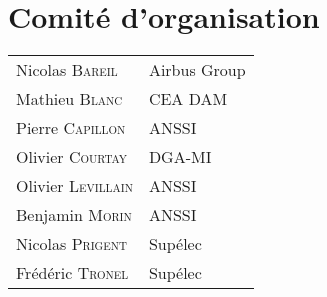 
\section*{Comit\'e d'organisation}
\begin{tabular}{@{}p{5cm}@{}p{6.5cm}@{}}
  Nicolas  \textsc{Bareil}        & Airbus Group                                 \\
  Mathieu  \textsc{Blanc}         & CEA DAM                                      \\
  Pierre   \textsc{Capillon}      & ANSSI                                        \\
  Olivier  \textsc{Courtay}       & DGA-MI                                       \\
  Olivier  \textsc{Levillain}     & ANSSI                                        \\
  Benjamin \textsc{Morin}         & ANSSI                                        \\
  Nicolas  \textsc{Prigent}       & Sup\'elec                                    \\
  Fr\'ed\'eric  \textsc{Tronel}   & Sup\'elec                                    \\
\end{tabular}

